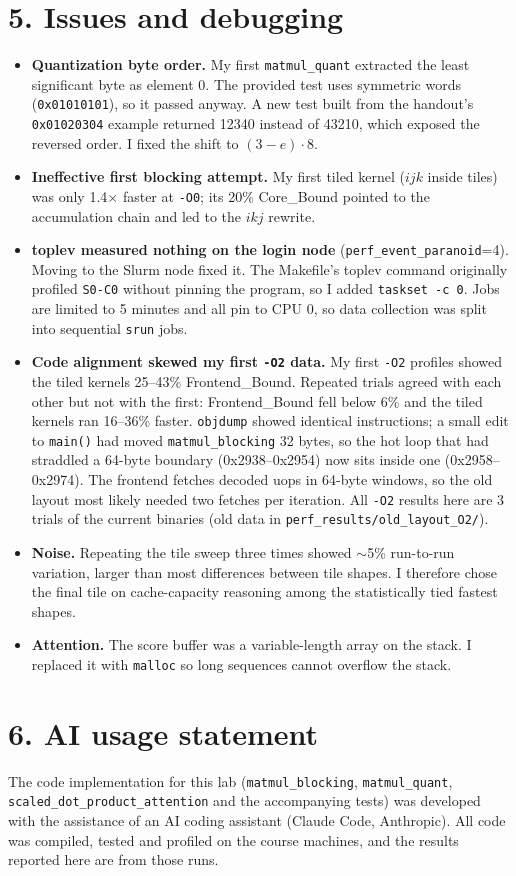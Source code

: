 \documentclass[10pt]{article}
\begin{document}
\section*{5. Issues and debugging}
\begin{itemize}
\item \textbf{Quantization byte order.} My first \texttt{matmul\_quant} extracted the least significant byte as element 0. The provided test uses symmetric words (\texttt{0x01010101}), so it passed anyway. A new test built from the handout's \texttt{0x01020304} example returned 12340 instead of 43210, which exposed the reversed order. I fixed the shift to $(3-e)\cdot 8$.
\item \textbf{Ineffective first blocking attempt.} My first tiled kernel ($ijk$ inside tiles) was only 1.4$\times$ faster at \texttt{-O0}; its 20\% Core\_Bound pointed to the accumulation chain and led to the $ikj$ rewrite.
\item \textbf{toplev measured nothing on the login node} (\texttt{perf\_event\_paranoid}=4). Moving to the Slurm node fixed it. The Makefile's toplev command originally profiled \texttt{S0-C0} without pinning the program, so I added \texttt{taskset -c 0}. Jobs are limited to 5 minutes and all pin to CPU 0, so data collection was split into sequential \texttt{srun} jobs.
\item \textbf{Code alignment skewed my first \texttt{-O2} data.} My first \texttt{-O2} profiles showed the tiled kernels 25--43\% Frontend\_Bound. Repeated trials agreed with each other but not with the first: Frontend\_Bound fell below 6\% and the tiled kernels ran 16--36\% faster. \texttt{objdump} showed identical instructions; a small edit to \texttt{main()} had moved \texttt{matmul\_blocking} 32 bytes, so the hot loop that had straddled a 64-byte boundary (0x2938--0x2954) now sits inside one (0x2958--0x2974). The frontend fetches decoded uops in 64-byte windows, so the old layout most likely needed two fetches per iteration. All \texttt{-O2} results here are 3 trials of the current binaries (old data in \texttt{perf\_results/old\_layout\_O2/}).
\item \textbf{Noise.} Repeating the tile sweep three times showed $\sim$5\% run-to-run variation, larger than most differences between tile shapes. I therefore chose the final tile on cache-capacity reasoning among the statistically tied fastest shapes.
\item \textbf{Attention.} The score buffer was a variable-length array on the stack. I replaced it with \texttt{malloc} so long sequences cannot overflow the stack.
\end{itemize}

\section*{6. AI usage statement}
The code implementation for this lab (\texttt{matmul\_blocking}, \texttt{matmul\_quant}, \texttt{scaled\_dot\_product\_attention} and the accompanying tests) was developed with the assistance of an AI coding assistant (Claude Code, Anthropic). All code was compiled, tested and profiled on the course machines, and the results reported here are from those runs.
\end{document}
